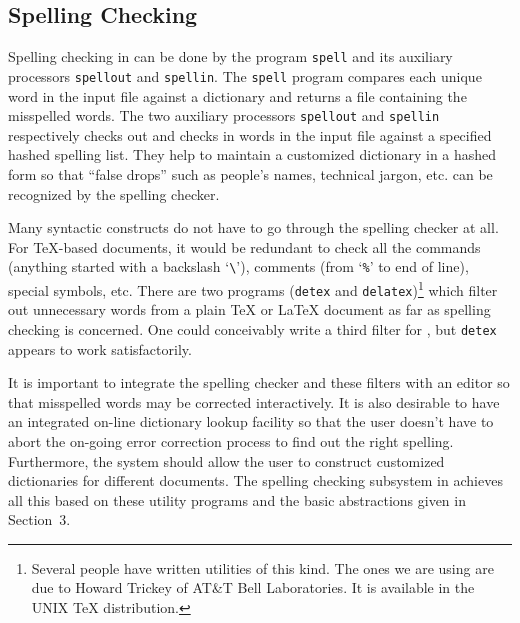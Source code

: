 \subsection{Spelling Checking}
Spelling checking in {\unix} can be done by the program \verb|spell|
and its auxiliary processors \verb|spellout| and \verb|spellin|.
The \verb|spell| program compares each unique word in the input file against a
dictionary and returns a file containing the misspelled words.
The two auxiliary processors \verb|spellout| and \verb|spellin| respectively
checks out and checks in words in the input file against a specified
hashed spelling list.  They help to maintain
a customized dictionary in a hashed form so that ``false drops'' such as
people's names, technical jargon, etc. can be recognized by the spelling
checker.

Many syntactic constructs do not have to go through the spelling checker
at all.
For {\TeX}-based documents, it would be redundant to check all the commands
(anything started with a backslash `\verb|\|'),
comments (from `\verb|%|' to end of line), special symbols, etc.
There are two programs ({\tt detex} and {\tt delatex})\footnote{Several
people have written utilities of this kind.  The ones we are using
are due to Howard Trickey of AT\&T Bell Laboratories.  It is
available in the UNIX {\TeX} distribution.}
which filter out unnecessary words from a plain {\TeX} or {\LaTeX} document
as far as spelling checking is concerned.
One could conceivably write a third filter for {\AmSTeX}, but {\tt detex}
appears to work satisfactorily.

It is important to integrate the spelling checker and these filters
with an editor so that misspelled words may be corrected interactively.
It is also desirable to have an integrated on-line dictionary lookup facility
so that the user doesn't have to abort the on-going error correction process to
find out the right spelling.  Furthermore, the system should allow
the user to construct customized dictionaries for different documents.
The spelling checking subsystem in {\TM} achieves all this based on 
these utility programs and the basic abstractions given in Section~3.

\newpage
